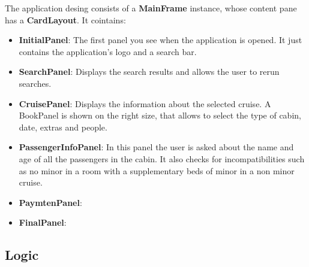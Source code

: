 \documentclass{article}
\begin{document}
   The application desing consists of a \textbf{MainFrame} instance, whose content pane has a \textbf{CardLayout}. It cointains:
   \begin{itemize}
	   \item \textbf{InitialPanel}: The first panel you see when the application is opened. It just contains the application's logo and a search bar.
   	   \item \textbf{SearchPanel}: Displays the search results and allows the user to rerun searches.
	   \item \textbf{CruisePanel}: Displays the information about the selected cruise. A BookPanel is shown on the right size, that allows to select the type of cabin, date, extras and people.
   	   \item \textbf{PassengerInfoPanel}: In this panel the user is asked about the name and age of all the passengers in the cabin. It also checks for incompatibilities such as no minor in a room with a supplementary beds of minor in a non minor cruise.
   	   \item \textbf{PaymtenPanel}:
   	   \item \textbf{FinalPanel}:
   \end{itemize}   
   
   \subsection{Logic}
\end{document}
